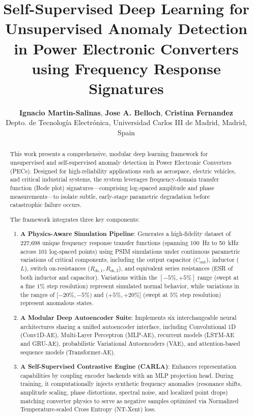 \documentclass[11pt,a4paper]{article}
\title{\textbf{Self-Supervised Deep Learning for Unsupervised Anomaly Detection in Power Electronic Converters using Frequency Response Signatures}}
\author{
    \textbf{Ignacio Martin-Salinas}, \textbf{Jose A. Belloch}, \textbf{Cristina Fernandez} \\
    \small Depto. de Tecnología Electrónica, Universidad Carlos III de Madrid, Madrid, Spain
}
\date{}
\begin{document}
\maketitle

\begin{abstract}
This work presents a comprehensive, modular deep learning framework for unsupervised and self-supervised anomaly detection in Power Electronic Converters (PECs). Designed for high-reliability applications such as aerospace, electric vehicles, and critical industrial systems, the system leverages frequency-domain transfer function (Bode plot) signatures---comprising log-spaced amplitude and phase measurements---to isolate subtle, early-stage parametric degradation before catastrophic failure occurs.

The framework integrates three key components:
\begin{enumerate}
    \item \textbf{A Physics-Aware Simulation Pipeline}: Generates a high-fidelity dataset of 227,698 unique frequency response transfer functions (spanning 100~Hz to 50~kHz across 101 log-spaced points) using PSIM simulations under continuous parametric variations of critical components, including the output capacitor ($C_{\text{out}}$), inductor ($L$), switch on-resistances ($R_{\text{ds},1}, R_{\text{ds},2}$), and equivalent series resistances (ESR of both inductor and capacitor). Variations within the $[-5\%, +5\%]$ range (swept at a fine $1\%$ step resolution) represent simulated normal behavior, while variations in the ranges of $[-20\%, -5\%)$ and $(+5\%, +20\%]$ (swept at $5\%$ step resolution) represent anomalous states.
    \item \textbf{A Modular Deep Autoencoder Suite}: Implements six interchangeable neural architectures sharing a unified autoencoder interface, including Convolutional 1D (Conv1D-AE), Multi-Layer Perceptron (MLP-AE), recurrent models (LSTM-AE and GRU-AE), probabilistic Variational Autoencoders (VAE), and attention-based sequence models (Transformer-AE).
    \item \textbf{A Self-Supervised Contrastive Engine (CARLA)}: Enhances representation capabilities by coupling encoder backends with an MLP projection head. During training, it computationally injects synthetic frequency anomalies (resonance shifts, amplitude scaling, phase distortions, spectral noise, and localized point drops) matching converter physics to serve as negative samples optimized via Normalized Temperature-scaled Cross Entropy (NT-Xent) loss.
\end{enumerate}


\end{abstract}
\end{document}
